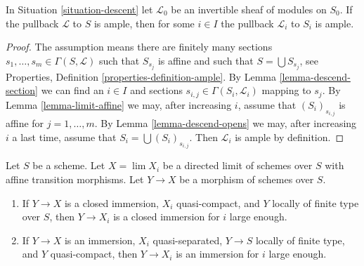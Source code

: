 \begin{lemma}
\label{lemma-limit-ample}
In Situation \ref{situation-descent} let $\mathcal{L}_0$ be an invertible
sheaf of modules on $S_0$. If the pullback $\mathcal{L}$ to $S$ is ample,
then for some $i \in I$ the pullback $\mathcal{L}_i$ to $S_i$ is ample.
\end{lemma}

\begin{proof}
The assumption means there are finitely many sections
$s_1, \ldots, s_m \in \Gamma(S, \mathcal{L})$ such that
$S_{s_j}$ is affine and such that $S = \bigcup S_{s_j}$, see
Properties, Definition \ref{properties-definition-ample}.
By Lemma \ref{lemma-descend-section} we can find an $i \in I$
and sections $s_{i, j} \in \Gamma(S_i, \mathcal{L}_i)$ mapping to $s_j$.
By Lemma \ref{lemma-limit-affine} we may, after increasing $i$, assume
that $(S_i)_{s_{i, j}}$ is affine for $j = 1, \ldots, m$.
By Lemma \ref{lemma-descend-opens} we may, after increasing $i$ a
last time, assume that $S_i = \bigcup (S_i)_{s_{i, j}}$.
Then $\mathcal{L}_i$ is ample by definition.
\end{proof}

\begin{lemma}
\label{lemma-finite-type-eventually-closed}
Let $S$ be a scheme. Let $X = \lim X_i$ be a directed limit of
schemes over $S$ with affine transition morphisms. Let $Y \to X$
be a morphism of schemes over $S$.
\begin{enumerate}
\item If $Y \to X$ is a closed immersion, $X_i$ quasi-compact, and
$Y$ locally of finite type over $S$, then $Y \to X_i$ is a closed
immersion for $i$ large enough.
\item If $Y \to X$ is an immersion, $X_i$ quasi-separated, $Y \to S$ locally
of finite type, and $Y$ quasi-compact, then $Y \to X_i$ is an
immersion for $i$ large enough.
\end{enumerate}
\end{lemma}

